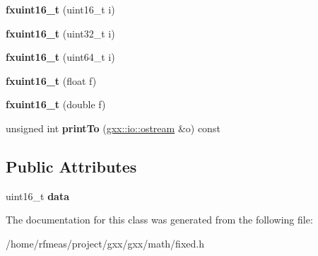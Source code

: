 \begin{DoxyCompactItemize}
\item 
{\bfseries fxuint16\+\_\+t} (uint16\+\_\+t i)\hypertarget{classfxuint16__t_a8bc9c203c12f0741d1e3c6d1a70883d3}{}\label{classfxuint16__t_a8bc9c203c12f0741d1e3c6d1a70883d3}

\item 
{\bfseries fxuint16\+\_\+t} (uint32\+\_\+t i)\hypertarget{classfxuint16__t_a0b6975a79aef164012c7ccfb50501128}{}\label{classfxuint16__t_a0b6975a79aef164012c7ccfb50501128}

\item 
{\bfseries fxuint16\+\_\+t} (uint64\+\_\+t i)\hypertarget{classfxuint16__t_acd32eeff8d46d84e186834fc7f43c58e}{}\label{classfxuint16__t_acd32eeff8d46d84e186834fc7f43c58e}

\item 
{\bfseries fxuint16\+\_\+t} (float f)\hypertarget{classfxuint16__t_af0c49a537d3a65048471c8557ddf1b37}{}\label{classfxuint16__t_af0c49a537d3a65048471c8557ddf1b37}

\item 
{\bfseries fxuint16\+\_\+t} (double f)\hypertarget{classfxuint16__t_a27b6c29442f481bd5f202534dc87a7b5}{}\label{classfxuint16__t_a27b6c29442f481bd5f202534dc87a7b5}

\item 
unsigned int {\bfseries print\+To} (\hyperlink{classgxx_1_1io_1_1ostream}{gxx\+::io\+::ostream} \&o) const \hypertarget{classfxuint16__t_af584dd511bfcf0365fc04d733351fd54}{}\label{classfxuint16__t_af584dd511bfcf0365fc04d733351fd54}

\end{DoxyCompactItemize}
\subsection*{Public Attributes}
\begin{DoxyCompactItemize}
\item 
uint16\+\_\+t {\bfseries data}\hypertarget{classfxuint16__t_a8410d9ae5f7dd5e91d8a1f40201ff463}{}\label{classfxuint16__t_a8410d9ae5f7dd5e91d8a1f40201ff463}

\end{DoxyCompactItemize}


The documentation for this class was generated from the following file\+:\begin{DoxyCompactItemize}
\item 
/home/rfmeas/project/gxx/gxx/math/fixed.\+h\end{DoxyCompactItemize}
